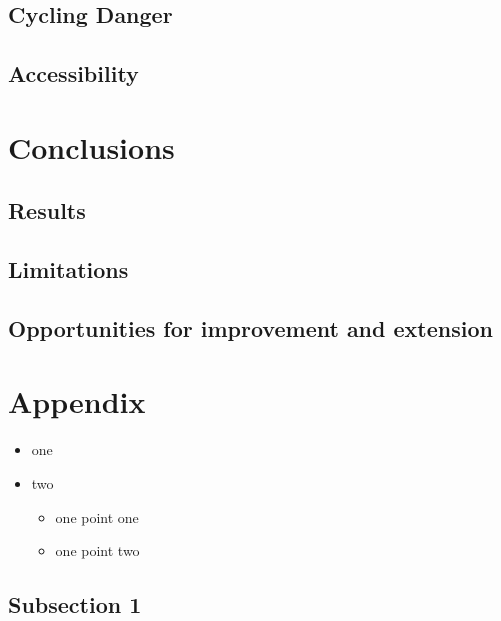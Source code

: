 \documentclass[11pt]{article} %
\begin{document}
\subsection{Cycling Danger}

\subsection{Accessibility}

\section{Conclusions}

\subsection{Results}

\subsection{Limitations}

\subsection{Opportunities for improvement and extension}




\section{Appendix}




\begin{itemize}
\item one
\item two
  \begin{itemize}
  \item one point one
  \item one point two
  \end{itemize}
\end{itemize}

\subsection{Subsection 1}
\end{document}
